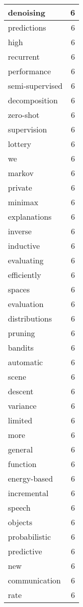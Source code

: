 \begin{table}[h]
\begin{tabular}{|l|r|}
\hline
denoising & 6 \\
\hline
predictions & 6 \\
\hline
high & 6 \\
\hline
recurrent & 6 \\
\hline
performance & 6 \\
\hline
semi-supervised & 6 \\
\hline
decomposition & 6 \\
\hline
zero-shot & 6 \\
\hline
supervision & 6 \\
\hline
lottery & 6 \\
\hline
we & 6 \\
\hline
markov & 6 \\
\hline
private & 6 \\
\hline
minimax & 6 \\
\hline
explanations & 6 \\
\hline
inverse & 6 \\
\hline
inductive & 6 \\
\hline
evaluating & 6 \\
\hline
efficiently & 6 \\
\hline
spaces & 6 \\
\hline
evaluation & 6 \\
\hline
distributions & 6 \\
\hline
pruning & 6 \\
\hline
bandits & 6 \\
\hline
automatic & 6 \\
\hline
scene & 6 \\
\hline
descent & 6 \\
\hline
variance & 6 \\
\hline
limited & 6 \\
\hline
more & 6 \\
\hline
general & 6 \\
\hline
function & 6 \\
\hline
energy-based & 6 \\
\hline
incremental & 6 \\
\hline
speech & 6 \\
\hline
objects & 6 \\
\hline
probabilistic & 6 \\
\hline
predictive & 6 \\
\hline
new & 6 \\
\hline
communication & 6 \\
\hline
rate & 6 \\

\end{tabular}
\end{table}
